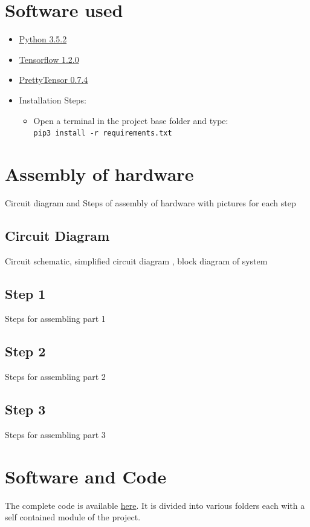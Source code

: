 \documentclass[a4paper,12pt,oneside]{book}
\begin{document}
\section{Software used}
\begin{itemize}
  \item \href{https://www.python.org/downloads/release/python-352/}{Python 3.5.2}
  \item \href{https://pypi.python.org/pypi/tensorflow/1.2.0}{Tensorflow 1.2.0}
  \item \href{https://github.com/google/prettytensor}{PrettyTensor 0.7.4} 
  \item Installation Steps:
  \begin{itemize}
  	\item Open a terminal in the project base folder and type: \\
  	\texttt{pip3 install -r requirements.txt}
  \end{itemize}
\end{itemize}

\section{Assembly of hardware}
Circuit diagram and Steps of assembly of hardware with pictures for each step
\subsection*{Circuit Diagram}
Circuit schematic, simplified circuit diagram , block diagram of system
\subsection*{Step 1}
Steps for assembling part 1
\subsection*{Step 2}
Steps for assembling part 2
\subsection*{Step 3}
Steps for assembling part 3



\section{Software and Code}
The complete code is available \href{https://github.com/eYSIP-2017/eYSIP-2017_Vegetable-Identification-Using-Transfer-Learning}{here}. It is divided into various folders each with a self contained module of the project.
\end{document}
